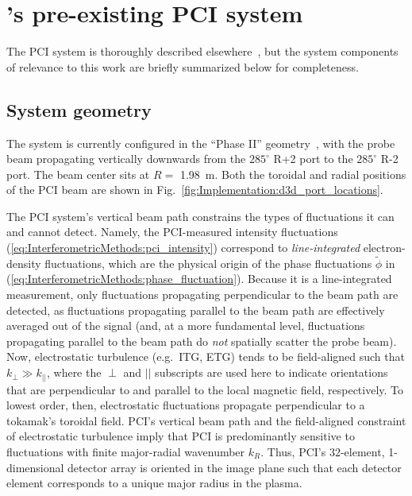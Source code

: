 \section{\diiid's pre-existing PCI system}
The \diiid \space PCI system is
thoroughly described elsewhere~\cite{dorris_rsi09, dorris_phd}, but
the system components of relevance to this work
are briefly summarized below for completeness.


\subsection{System geometry}
The system is currently configured
in the ``Phase II'' geometry~\cite{dorris_rsi09},
with the probe beam propagating vertically downwards
from the $285^{\circ}$ R+2 port to the $285^{\circ}$ R-2 port.
The beam center sits at $R = $ \SI{1.98}{\meter}.
Both the toroidal and radial positions
of the PCI beam are shown in
Fig.~\ref{fig:Implementation:d3d_port_locations}.

The PCI system's vertical beam path constrains
the types of fluctuations it can and cannot detect.
Namely, the PCI-measured intensity fluctuations
(\ref{eq:InterferometricMethods:pci_intensity})
correspond to \emph{line-integrated} electron-density fluctuations, which
are the physical origin of the phase fluctuations $\tilde{\phi}$ in
(\ref{eq:InterferometricMethods:phase_fluctuation}).
Because it is a line-integrated measurement,
only fluctuations propagating perpendicular to the beam path are detected,
as fluctuations propagating parallel to the beam path
are effectively averaged out of the signal
\graffito{\textcolor{red}{what about $\delta \omega$?}}
(and, at a more fundamental level, fluctuations propagating
parallel to the beam path do \emph{not} spatially scatter the probe beam).
\graffito{\textcolor{red}{citation? Wesson?}}
Now, electrostatic turbulence (e.g.\ ITG, ETG) tends to be field-aligned
such that $k_{\perp} \gg k_{||}$, where
the $\perp$ and $||$ subscripts are used here to indicate
orientations that are perpendicular to and parallel to
the local magnetic field, respectively.
To lowest order, then, electrostatic fluctuations propagate
perpendicular to a tokamak's toroidal field.
PCI's vertical beam path and
the field-aligned constraint of electrostatic turbulence
imply that PCI is predominantly sensitive to fluctuations
with finite major-radial wavenumber $k_R$.
Thus, PCI's 32-element, 1-dimensional detector array
is oriented in the image plane such that
each detector element corresponds to a unique major radius in the plasma.

